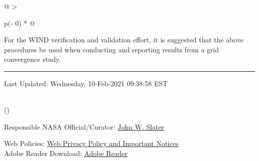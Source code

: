 \begin{longtable}[]{@{}
  >{\raggedright\arraybackslash}p{(\columnwidth - 0\tabcolsep) * }@{}}
\begin{minipage}[t]{\linewidth}
For the WIND verification and validation effort, it is suggested that
the above procedures be used when conducting and reporting results from
a grid convergence study.

\begin{center}\rule{0.5\linewidth}{0.5pt}\end{center}

{Last Updated:} Wednesday, 10-Feb-2021 09:38:58 EST\\
\strut
\end{minipage} \\
\bottomrule()
\end{longtable}

\hypertarget{footer}{}
{Responsible NASA Official/Curator:}
\href{mailto:john.w.slater@nasa.gov}{John W. Slater}

{{Web Policies: }
\href{http://www.grc.nasa.gov/Doc/grcwebpolicies.html}{Web Privacy
Policy and Important Notices}}\\
{Adobe Reader Download: }
\href{http://www.adobe.com/products/acrobat/readstep2.html}{Adobe
Reader}

%